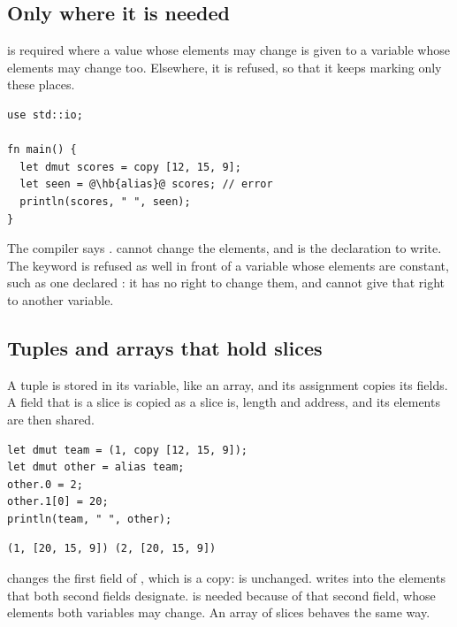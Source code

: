 \subsection{Only where it is needed}

 is required where a value whose elements may change is given to a
variable whose elements may change too. Elsewhere, it is refused, so that it
keeps marking only these places.

\begin{lstlisting}[style=coloredverbatimError, escapechar=@, caption=An alias to a constant]
use std::io;

fn main() {
  let dmut scores = copy [12, 15, 9];
  let seen = @\hb{alias}@ scores; // error
  println(scores, " ", seen);
}
\end{lstlisting}

The compiler says .  cannot change the
elements, and  is the declaration to write. The
keyword is refused as well in front of a variable whose elements are constant,
such as one declared : it has no right to change them, and
cannot give that right to another variable.

\subsection{Tuples and arrays that hold slices}

A tuple is stored in its variable, like an array, and its assignment copies its
fields. A field that is a slice is copied as a slice is, length and address, and
its elements are then shared.

\begin{lstlisting}[style=coloredverbatim]
let dmut team = (1, copy [12, 15, 9]);
let dmut other = alias team;
other.0 = 2;
other.1[0] = 20;
println(team, " ", other);
\end{lstlisting}
\vspace{-10pt}%
\begin{lstlisting}[style=bashVerb]
(1, [20, 15, 9]) (2, [20, 15, 9])
\end{lstlisting}

 changes the first field of , which is a copy:
 is unchanged.  writes
into the elements that both second fields designate.  is needed
because of that second field, whose elements both variables may change. An
array of slices behaves the same way.
